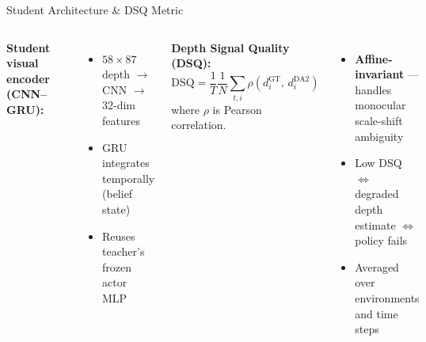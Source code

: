 \documentclass[aspectratio=169,10pt]{beamer}
\begin{document}
\begin{frame}{Student Architecture \& DSQ Metric}
\begin{columns}[T]
  \textbf{Student visual encoder (CNN--GRU):}
  \vspace{0.2em}
  \begin{center}
    \scalebox{0.78}{%
    }
  \end{center}
  {\small
  \begin{itemize}
    \item $58{\times}87$ depth $\to$ CNN $\to$ 32-dim features
    \item GRU integrates temporally (belief state)
    \item Reuses teacher's frozen actor MLP
  \end{itemize}
  }

  \textbf{Depth Signal Quality (DSQ):}
  \[
    \text{DSQ} = \frac{1}{T}\frac{1}{N}\sum_{t,i}
      \rho\!\left(d^{\text{GT}}_i,\, d^{\text{DA2}}_i\right)
  \]
  where $\rho$ is Pearson correlation.

  \vspace{0.5em}
  \begin{itemize}
    \setlength\itemsep{0.4em}
    \item \textbf{Affine-invariant} --- handles monocular scale-shift ambiguity
    \item Low DSQ $\Leftrightarrow$ degraded depth estimate $\Leftrightarrow$ policy fails
    \item Averaged over environments and time steps
  \end{itemize}
\end{columns}
\end{frame}
\end{document}
